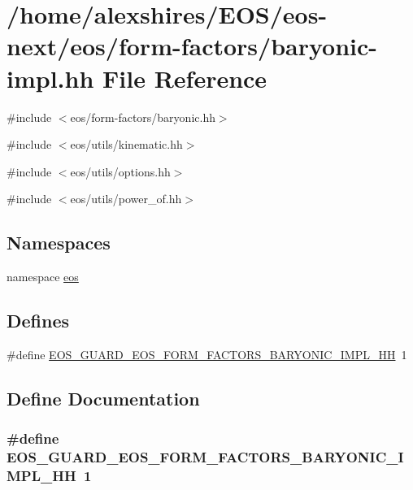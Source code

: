 \hypertarget{baryonic-impl_8hh}{
\section{/home/alexshires/EOS/eos-\/next/eos/form-\/factors/baryonic-\/impl.hh File Reference}
\label{baryonic-impl_8hh}
}
{\ttfamily \#include $<$eos/form-\/factors/baryonic.hh$>$}\par
{\ttfamily \#include $<$eos/utils/kinematic.hh$>$}\par
{\ttfamily \#include $<$eos/utils/options.hh$>$}\par
{\ttfamily \#include $<$eos/utils/power\_\-of.hh$>$}\par
\subsection*{Namespaces}
\begin{DoxyCompactItemize}
\item 
namespace \hyperlink{namespaceeos}{eos}
\end{DoxyCompactItemize}
\subsection*{Defines}
\begin{DoxyCompactItemize}
\item 
\#define \hyperlink{baryonic-impl_8hh_acaeb03191ea820ed98356d32c67df0c8}{EOS\_\-GUARD\_\-EOS\_\-FORM\_\-FACTORS\_\-BARYONIC\_\-IMPL\_\-HH}~1
\end{DoxyCompactItemize}


\subsection{Define Documentation}
\hypertarget{baryonic-impl_8hh_acaeb03191ea820ed98356d32c67df0c8}{
\subsubsection[{EOS\_\-GUARD\_\-EOS\_\-FORM\_\-FACTORS\_\-BARYONIC\_\-IMPL\_\-HH}]{\setlength{\rightskip}{0pt plus 5cm}\#define EOS\_\-GUARD\_\-EOS\_\-FORM\_\-FACTORS\_\-BARYONIC\_\-IMPL\_\-HH~1}}
\label{baryonic-impl_8hh_acaeb03191ea820ed98356d32c67df0c8}
